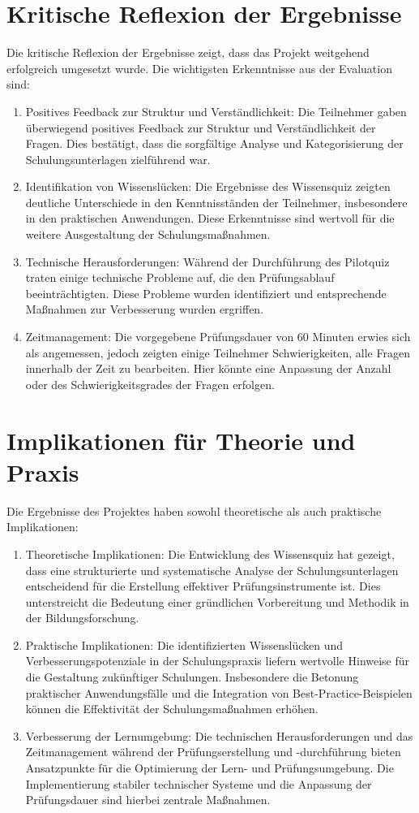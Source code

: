 \section{Kritische Reflexion der Ergebnisse}
Die kritische Reflexion der Ergebnisse zeigt, dass das Projekt weitgehend erfolgreich umgesetzt wurde. Die wichtigsten Erkenntnisse aus der Evaluation sind:
\begin{enumerate}
    \item Positives Feedback zur Struktur und Verständlichkeit: Die Teilnehmer gaben überwiegend positives Feedback zur Struktur und Verständlichkeit der Fragen. Dies bestätigt, dass die sorgfältige Analyse und Kategorisierung der Schulungsunterlagen zielführend war.
    \item Identifikation von Wissenslücken: Die Ergebnisse des Wissensquiz zeigten deutliche Unterschiede in den Kenntnisständen der Teilnehmer, insbesondere in den praktischen Anwendungen. Diese Erkenntnisse sind wertvoll für die weitere Ausgestaltung der Schulungsmaßnahmen.
    \item Technische Herausforderungen: Während der Durchführung des Pilotquiz traten einige technische Probleme auf, die den Prüfungsablauf beeinträchtigten. Diese Probleme wurden identifiziert und entsprechende Maßnahmen zur Verbesserung wurden ergriffen.
    \item Zeitmanagement: Die vorgegebene Prüfungsdauer von 60 Minuten erwies sich als angemessen, jedoch zeigten einige Teilnehmer Schwierigkeiten, alle Fragen innerhalb der Zeit zu bearbeiten. Hier könnte eine Anpassung der Anzahl oder des Schwierigkeitsgrades der Fragen erfolgen.
\end{enumerate}

\section{Implikationen für Theorie und Praxis}
Die Ergebnisse des Projektes haben sowohl theoretische als auch praktische Implikationen:
\begin{enumerate}
    \item Theoretische Implikationen: Die Entwicklung des Wissensquiz hat gezeigt, dass eine strukturierte und systematische Analyse der Schulungsunterlagen entscheidend für die Erstellung effektiver Prüfungsinstrumente ist. Dies unterstreicht die Bedeutung einer gründlichen Vorbereitung und Methodik in der Bildungsforschung.
    \item Praktische Implikationen: Die identifizierten Wissenslücken und Verbesserungspotenziale in der Schulungspraxis liefern wertvolle Hinweise für die Gestaltung zukünftiger Schulungen. Insbesondere die Betonung praktischer Anwendungsfälle und die Integration von Best-Practice-Beispielen können die Effektivität der Schulungsmaßnahmen erhöhen.
    \item Verbesserung der Lernumgebung: Die technischen Herausforderungen und das Zeitmanagement während der Prüfungserstellung und -durchführung bieten Ansatzpunkte für die Optimierung der Lern- und Prüfungsumgebung. Die Implementierung stabiler technischer Systeme und die Anpassung der Prüfungsdauer sind hierbei zentrale Maßnahmen.
\end{enumerate}


